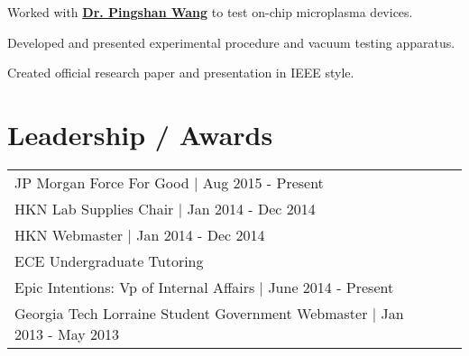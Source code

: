 \documentclass[letterpaper]{deedy-resume-openfont} %
\begin{document}
\begin{minipage}[t]{0.66\textwidth}

\begin{tightitemize}
\item Worked with \textbf{\href{http://www.clemson.edu/ces/departments/ece/faculty_staff/faculty/pwang.html}{Dr. Pingshan Wang}} to test on-chip microplasma devices.
\item Developed and presented experimental procedure and vacuum testing apparatus.
\item Created official research paper and presentation in IEEE style.
\end{tightitemize}






\section{Leadership / Awards} 

\begin{tabular}{lll}
JP Morgan Force For Good | Aug 2015 - Present \\
HKN Lab Supplies Chair | Jan 2014 - Dec 2014 \\
HKN Webmaster | Jan 2014 - Dec 2014 \\
ECE Undergraduate Tutoring\\
Epic Intentions: Vp of Internal Affairs | June 2014 - Present \\
Georgia Tech  Lorraine Student Government Webmaster | Jan 2013 - May 2013 \\
\end{tabular}





\end{minipage} %

\end{document}
